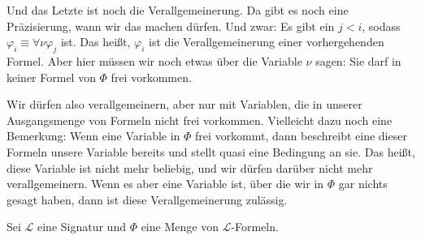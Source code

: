 \begin{spoken-clean}[00:23:48 - 00:25:54]
Und das Letzte ist noch die Verallgemeinerung. Da gibt es noch eine Präzisierung, wann wir das machen dürfen. Und zwar: Es gibt ein $j < i$, sodass $\varphi_i \equiv \forall \nu \varphi_j$ ist. Das heißt, $\varphi_i$ ist die Verallgemeinerung einer vorhergehenden Formel. Aber hier müssen wir noch etwas über die Variable $\nu$ sagen: Sie darf in keiner Formel von $\Phi$ frei vorkommen.

Wir dürfen also verallgemeinern, aber nur mit Variablen, die in unserer Ausgangsmenge von Formeln nicht frei vorkommen. Vielleicht dazu noch eine Bemerkung: Wenn eine Variable in $\Phi$ frei vorkommt, dann beschreibt eine dieser Formeln unsere Variable bereits und stellt quasi eine Bedingung an sie. Das heißt, diese Variable ist nicht mehr beliebig, und wir dürfen darüber nicht mehr verallgemeinern. Wenn es aber eine Variable ist, über die wir in $\Phi$ gar nichts gesagt haben, dann ist diese Verallgemeinerung zulässig.
\end{spoken-clean}

\begin{math-stroke}
Sei $\mathcal{L}$ eine Signatur und $\Phi$ eine Menge von $\mathcal{L}$-Formeln.

\end{math-stroke}

